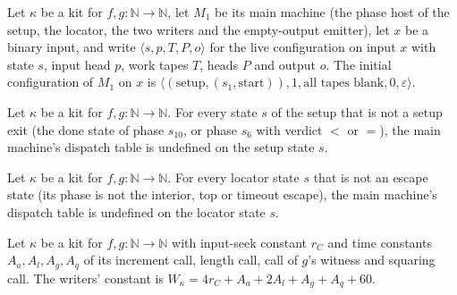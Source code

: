 \begin{theorem}
\label{Turing.NTimeDiag.qy_initCfg}
\leanok
{}
Let $\kappa$ be a kit for $f, g : \mathbb{N} \to \mathbb{N}$, let $M_1$ be its main machine (the
phase host of the setup, the locator, the two writers and the empty-output emitter), let $x$ be a
binary input, and write $\langle s, p, T, P, o\rangle$ for the live configuration on input $x$ with
state $s$, input head $p$, work tapes $T$, heads $P$ and output $o$. The initial configuration of
$M_1$ on $x$ is $\langle (\mathrm{setup}, (s_1, \mathrm{start})), 1, \text{all tapes blank}, 0,
\varepsilon \rangle$.
\end{theorem}

\begin{theorem}
\label{Turing.NTimeDiag.qy_mainRed_setup}
\leanok
{}
Let $\kappa$ be a kit for $f, g : \mathbb{N} \to \mathbb{N}$. For every state $s$ of the setup that
is not a setup exit (the done state of phase $s_{10}$, or phase $s_6$ with verdict $<$ or $=$), the
main machine's dispatch table is undefined on the setup state $s$.
\end{theorem}

\begin{theorem}
\label{Turing.NTimeDiag.qy_mainRed_loc}
\leanok
{}
Let $\kappa$ be a kit for $f, g : \mathbb{N} \to \mathbb{N}$. For every locator state $s$ that is
not an escape state (its phase is not the interior, top or timeout escape), the main machine's
dispatch table is undefined on the locator state $s$.
\end{theorem}

\begin{definition}
\label{Turing.NTimeDiag.qyWk}
\leanok
{}
Let $\kappa$ be a kit for $f, g : \mathbb{N} \to \mathbb{N}$ with input-seek constant $r_C$ and
time constants $A_a, A_l, A_g, A_q$ of its increment call, length call, call of $g$'s witness and
squaring call. The writers' constant is $W_\kappa = 4r_C + A_a + 2A_l + A_g + A_q + 60$.
\end{definition}

